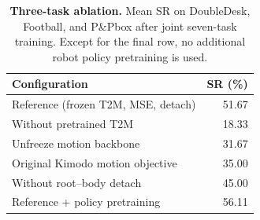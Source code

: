 \begin{table}[t]
\centering\small
\caption{\textbf{Three-task ablation.} Mean SR on DoubleDesk, Football, and P\&Pbox after joint seven-task training. Except for the final row, no additional robot policy pretraining is used.}
\label{tab:ablation}
\begin{tabular}{lr}\toprule
Configuration & SR (\%)\\\midrule
Reference (frozen T2M, MSE, detach) &51.67\\
Without pretrained T2M &18.33\\
Unfreeze motion backbone &31.67\\
Original Kimodo motion objective &35.00\\
Without root--body detach &45.00\\
Reference + policy pretraining &56.11\\\bottomrule
\end{tabular}
\end{table}
